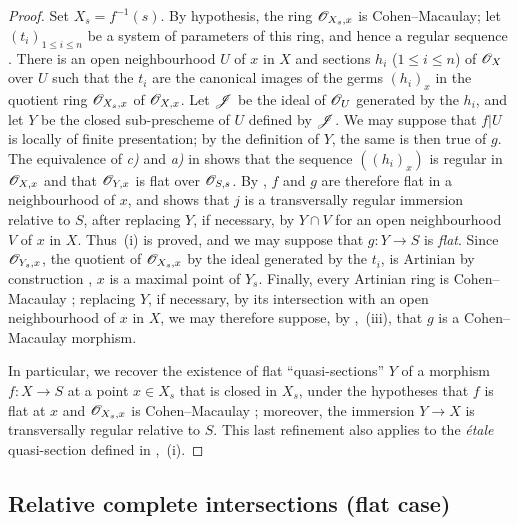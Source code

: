 \begin{proof}
Set $X_s=f^{-1}(s)$. By hypothesis, the ring $\mathscr{O}_{X_s,x}$ is Cohen--Macaulay; let $(t_i)_{1\leq i\leq n}$ be a system of parameters of this ring, and hence a regular sequence .
There is an open neighbourhood $U$ of $x$ in $X$ and sections $h_i$ ($1\leq i\leq n$) of $\mathscr{O}_X$ over $U$ such that the $t_i$ are the canonical images of the germs $(h_i)_x$ in the quotient ring $\mathscr{O}_{X_s,x}$ of $\mathscr{O}_{X,x}$.
Let $\mathscr{J}$ be the ideal of $\mathscr{O}_U$ generated by the $h_i$, and let $Y$ be the closed sub-prescheme of $U$ defined by $\mathscr{J}$.
We may suppose that $f|U$ is locally of finite presentation; by the definition of $Y$, the same is then true of $g$.
The equivalence of \emph{c)} and \emph{a)} in  shows that the sequence $((h_i)_x)$ is regular in $\mathscr{O}_{X,x}$ and that $\mathscr{O}_{Y,x}$ is flat over $\mathscr{O}_{S,s}$. By , $f$ and $g$ are therefore flat in a neighbourhood of $x$, and  shows that $j$ is a transversally regular immersion relative to $S$, after replacing $Y$, if necessary, by $Y\cap V$ for an open neighbourhood $V$ of $x$ in $X$.
Thus~(i) is proved, and we may suppose that $g:Y\to S$ is \emph{flat}.
Since $\mathscr{O}_{Y_s,x}$, the quotient of $\mathscr{O}_{X_s,x}$ by the ideal generated by the $t_i$, is Artinian by construction , $x$ is a maximal point of $Y_s$.
Finally, every Artinian ring is Cohen--Macaulay ; replacing $Y$, if necessary, by its intersection with an open neighbourhood of $x$ in $X$, we may therefore suppose, by ,~(iii), that $g$ is a Cohen--Macaulay morphism.

In particular, we recover the existence of flat ``quasi-sections'' $Y$ of a morphism $f:X\to S$ at a point $x\in X_s$ that is closed in $X_s$, under the hypotheses that $f$ is flat at $x$ and $\mathscr{O}_{X_s,x}$ is Cohen--Macaulay ; moreover, the immersion $Y\to X$ is transversally regular relative to $S$.
This last refinement also applies to the \emph{\'etale} quasi-section defined in ,~(i).
\end{proof}

\subsection{Relative complete intersections (flat case)}
\label{subsection:IV.19.3}


